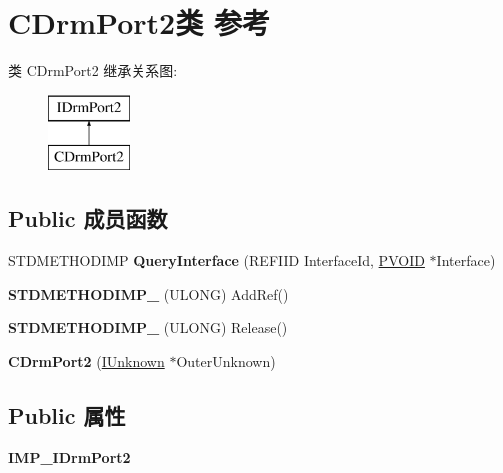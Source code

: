 \hypertarget{class_c_drm_port2}{}\section{C\+Drm\+Port2类 参考}
\label{class_c_drm_port2}
类 C\+Drm\+Port2 继承关系图\+:\begin{figure}[H]
\begin{center}
\leavevmode
\includegraphics[height=2.000000cm]{class_c_drm_port2}
\end{center}
\end{figure}
\subsection*{Public 成员函数}
\begin{DoxyCompactItemize}
\item 
\mbox{\label{class_c_drm_port2_ab58d8483ba381df3de4a8ff6784182f3}} 
S\+T\+D\+M\+E\+T\+H\+O\+D\+I\+MP {\bfseries Query\+Interface} (R\+E\+F\+I\+ID Interface\+Id, \hyperlink{interfacevoid}{P\+V\+O\+ID} $\ast$Interface)
\item 
\mbox{\label{class_c_drm_port2_abbf1388e433f3dfe021a9ed2d498c488}} 
{\bfseries S\+T\+D\+M\+E\+T\+H\+O\+D\+I\+M\+P\+\_\+} (U\+L\+O\+NG) Add\+Ref()
\item 
\mbox{\label{class_c_drm_port2_ab474f5eab89c4838e7db764278003c3f}} 
{\bfseries S\+T\+D\+M\+E\+T\+H\+O\+D\+I\+M\+P\+\_\+} (U\+L\+O\+NG) Release()
\item 
\mbox{\label{class_c_drm_port2_a7a006c14949f58b42a80eab6c6235acd}} 
{\bfseries C\+Drm\+Port2} (\hyperlink{interface_i_unknown}{I\+Unknown} $\ast$Outer\+Unknown)
\end{DoxyCompactItemize}
\subsection*{Public 属性}
\begin{DoxyCompactItemize}
\item 
\mbox{\label{class_c_drm_port2_a2ec554eacb25faaf7e6d801015061de8}} 
{\bfseries I\+M\+P\+\_\+\+I\+Drm\+Port2}
\end{DoxyCompactItemize}
